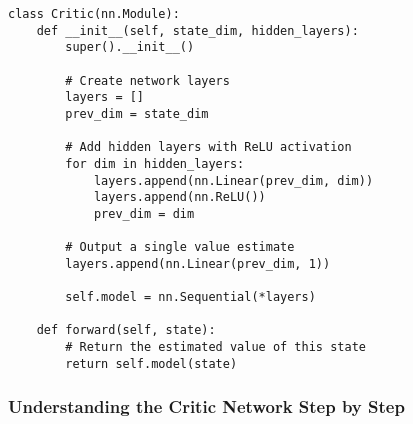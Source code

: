 \documentclass[11pt]{article}
\begin{document}
\begin{lstlisting}[style=Python]
class Critic(nn.Module):
    def __init__(self, state_dim, hidden_layers):
        super().__init__()
        
        # Create network layers
        layers = []
        prev_dim = state_dim
        
        # Add hidden layers with ReLU activation
        for dim in hidden_layers:
            layers.append(nn.Linear(prev_dim, dim))
            layers.append(nn.ReLU())
            prev_dim = dim
        
        # Output a single value estimate
        layers.append(nn.Linear(prev_dim, 1))
        
        self.model = nn.Sequential(*layers)
        
    def forward(self, state):
        # Return the estimated value of this state
        return self.model(state)
\end{lstlisting}

\subsubsection*{Understanding the Critic Network Step by Step}
\end{document}
